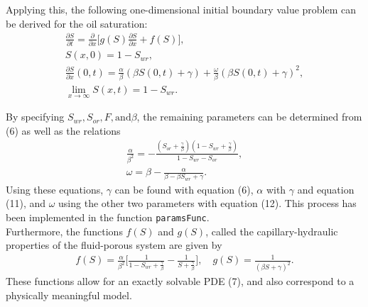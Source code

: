 \documentclass[11pt]{article}
\begin{document}
Applying this, the following one-dimensional initial boundary value problem can be derived for the oil saturation:
\begin{eqnarray}
\frac{\partial S}{\partial t} = \frac{\partial}{\partial x} \big[g(S)\frac{\partial S}{\partial x} + f(S)\big],\\
S(x,0)=1-S_{wr},\\
\frac{\partial S}{\partial x}(0,t) = \frac{\alpha}{\beta}(\beta S(0,t)+\gamma) + \frac{\omega}{\beta}(\beta S(0,t)+\gamma)^2,\\
\lim_{x\to\infty}S(x,t)=1-S_{wr}.
\end{eqnarray}

By specifying $S_{wr}, S_{or}, F, \text{and} \beta$, the remaining parameters can be determined from (6) as well as the relations
\begin{eqnarray}
\frac{\alpha}{\beta^2}=-\frac{(S_{or}+\frac{\gamma}{\beta})(1-S_{wr}+\frac{\gamma}{\beta})}{1-S_{wr}-S_{or}},\\
\omega = \beta -\frac{\alpha}{\beta-\beta S_{wr}+\gamma}.
\end{eqnarray}
Using these equations, $\gamma$ can be found with equation (6), $\alpha$ with $\gamma$ and equation (11), and $\omega$ using the other two parameters with equation (12). This process has been implemented in the function \verb|paramsFunc|.\\

Furthermore, the functions $f(S)$ and $g(S)$, called the capillary-hydraulic properties of the fluid-porous system are given by
\begin{eqnarray*}
f(S) = \frac{\alpha}{\beta^2}\bigg[\frac{1}{1-S_{wr}+\frac{\gamma}{\beta}}-\frac{1}{S+\frac{\gamma}{\beta}}\bigg],\quad g(S)=\frac{1}{(\beta S+\gamma)^2}.
\end{eqnarray*}
These functions allow for an exactly solvable PDE (7), and also correspond to a physically meaningful model.

\smallbreak
\end{document}
